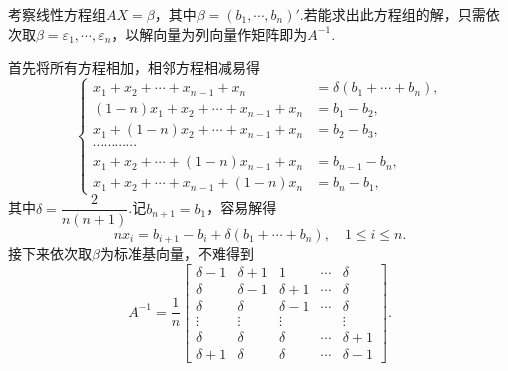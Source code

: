 \begin{sol}[(求$A^{-1}$)]
	考察线性方程组$AX=\beta$，其中$\beta=(b_1,\cdots,b_n)'$.若能求出此方程组的解，只需依次取$\beta=\varepsilon_1,\cdots,\varepsilon_n$，以解向量为列向量作矩阵即为$A^{-1}$.

	首先将所有方程相加，相邻方程相减易得
	\[\left\{\begin{array}{ll}
			x_1+x_2+\cdots+x_{n-1}+x_n      & =\delta(b_1+\cdots+b_n), \\
			(1-n)x_1+x_2+\cdots+x_{n-1}+x_n & =b_1-b_2,                \\
			x_1+(1-n)x_2+\cdots+x_{n-1}+x_n & =b_2-b_3,                \\
			\cdots\cdots\cdots\cdots        &                          \\
			x_1+x_2+\cdots+(1-n)x_{n-1}+x_n & =b_{n-1}-b_n,            \\
			x_1+x_2+\cdots+x_{n-1}+(1-n)x_n & =b_n-b_1,
		\end{array}\right.\]
	其中$\delta=\dfrac{2}{n(n+1)}$.记$b_{n+1}=b_1$，容易解得
	\[
		nx_i=b_{i+1}-b_i+\delta(b_1+\cdots+b_n),\quad 1\le i\le n.
	\]
	接下来依次取$\beta$为标准基向量，不难得到
	\[A^{-1}=\frac{1}{n}
		\begin{bmatrix}
			\delta-1 & \delta+1 & 1        & \cdots & \delta   \\
			\delta   & \delta-1 & \delta+1 & \cdots & \delta   \\
			\delta   & \delta   & \delta-1 & \cdots & \delta   \\
			\vdots   & \vdots   & \vdots   &        & \vdots   \\
			\delta   & \delta   & \delta   & \cdots & \delta+1 \\
			\delta+1 & \delta   & \delta   & \cdots & \delta-1
		\end{bmatrix}.
	\]
\end{sol}
